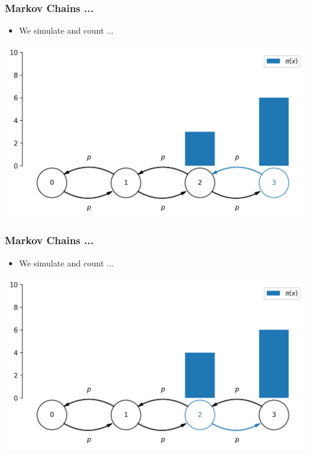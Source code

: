 \begin{frame}[c]
    \frametitle{Markov Chains ...}
    \begin{itemize}
        \item We simulate and count ...
    \end{itemize}
    \begin{center}
        \includegraphics[scale=0.6]{imgs/simulation8.png}
    \end{center}
\end{frame}

\begin{frame}[c]
    \frametitle{Markov Chains ...}
    \begin{itemize}
        \item We simulate and count ...
    \end{itemize}
    \begin{center}
        \includegraphics[scale=0.6]{imgs/simulation9.png}
    \end{center}
\end{frame}

